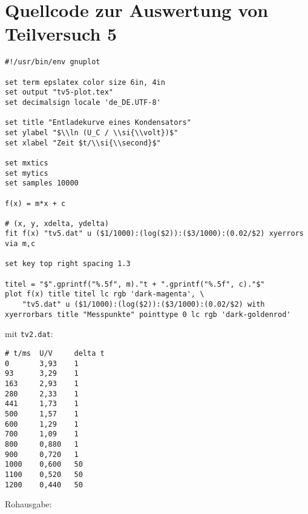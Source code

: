 \section{\gnuplot{} Quellcode zur Auswertung von Teilversuch 5}
    \label{appdx:gnuplottv5}
    {  
        \renewcommand{\fcolorbox}[4][]{#4}
        \begin{verbatim}
#!/usr/bin/env gnuplot

set term epslatex color size 6in, 4in
set output "tv5-plot.tex"
set decimalsign locale 'de_DE.UTF-8'

set title "Entladekurve eines Kondensators"
set ylabel "$\\ln (U_C / \\si{\\volt})$"
set xlabel "Zeit $t/\\si{\\second}$"

set mxtics
set mytics
set samples 10000

f(x) = m*x + c

# (x, y, xdelta, ydelta)
fit f(x) "tv5.dat" u ($1/1000):(log($2)):($3/1000):(0.02/$2) xyerrors via m,c

set key top right spacing 1.3

titel = "$".gprintf("%.5f", m)."t + ".gprintf("%.5f", c)."$"
plot f(x) title titel lc rgb 'dark-magenta', \
    "tv5.dat" u ($1/1000):(log($2)):($3/1000):(0.02/$2) with xyerrorbars title "Messpunkte" pointtype 0 lc rgb 'dark-goldenrod'
        \end{verbatim}
    }
    mit \texttt{tv2.dat}:
    \begin{multicols}{2}
        \begin{verbatim}
# t/ms  U/V     delta t
0       3,93    1
93      3,29    1
163     2,93    1
280     2,33    1
441     1,73    1
500     1,57    1
600     1,29    1
700     1,09    1
800     0,880   1
900     0,720   1
1000    0,600   50
1100    0,520   50
1200    0,440   50
        \end{verbatim}
    \end{multicols}
    \vspace{-\baselineskip}
    Rohausgabe:
